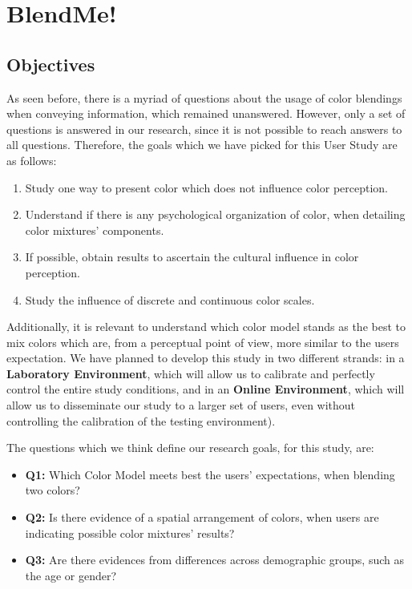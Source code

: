 
\chapter{BlendMe!}
\label{chapter:design}

\section{Objectives}
\label{sec:impl_objectives}
%
As seen before, there is a myriad of questions about the usage of color blendings when conveying information, which remained unanswered. However, only a set of questions
is answered in our research, since it is not possible to reach answers to all questions. Therefore, the goals which we have picked for this User Study are as follows:
%
\begin{enumerate}
	\item Study one way to present color which does not influence color perception.
  \item Understand if there is any psychological organization of color, when detailing color mixtures' components.
  \item If possible, obtain results to ascertain the cultural influence in color perception.
  \item Study the influence of discrete and continuous color scales.
\end{enumerate}
%
Additionally, it is relevant to understand which color model stands as the best to mix colors which are, from a perceptual point of view, more similar to the users expectation.
We have planned to develop this study in two different strands: in a \textbf{Laboratory Environment}, which will allow us to calibrate and perfectly control the entire study conditions,
and in an \textbf{Online Environment}, which will allow us to disseminate our study to a larger set of users, even without controlling the calibration of the testing environment). \par
%
The questions which we think define our research goals, for this study, are:
%
\begin{itemize}
	\item \textbf{Q1:} Which Color Model meets best the users' expectations, when blending two colors?
	\item \textbf{Q2:} Is there evidence of a spatial arrangement of colors, when users are indicating possible color mixtures' results?
	\item \textbf{Q3:} Are there evidences from differences across demographic groups, such as the age or gender?
\end{itemize}
